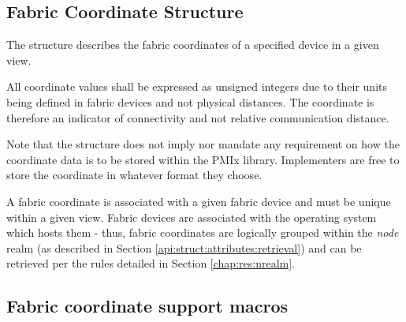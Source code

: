 \begin{arglist}
\end{arglist}


\subsection{Fabric Coordinate Structure}

The  structure describes the fabric coordinates of a specified device in a given view.


All coordinate values shall be expressed as unsigned integers due to their units being defined in fabric devices and not physical distances. The coordinate is therefore an indicator of connectivity and not relative communication distance.

\adviceimplstart
Note that the  structure does not imply nor mandate any requirement on how the coordinate data is to be stored within the \ac{PMIx} library. Implementers are free to store the coordinate in whatever format they choose.
\adviceimplend

A fabric coordinate is associated with a given fabric device and must be unique within a given view. Fabric devices are associated with the operating system which hosts them - thus, fabric coordinates are logically grouped within the \emph{node} realm (as described in Section \ref{api:struct:attributes:retrieval}) and can be retrieved per the rules detailed in Section \ref{chap:res:nrealm}.

\subsection{Fabric coordinate support macros}
\label{api:netcoord:macros}

